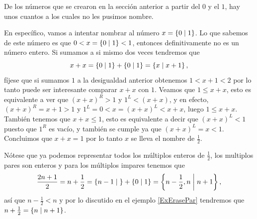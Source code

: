     \begin{example}
        De los n\'umeros que se crearon en la secci\'on anterior a partir del $0$ y el $1$, hay unos cuantos a los cuales no les pusimos nombre.

        En espec\'ifico, vamos a intentar nombrar al n\'umero $x = \left\{0\;\middle|\; 1\right\}$. Lo que sabemos de este n\'umero es que $0 < x = \left\{0\;\middle|\; 1\right\} < 1$, entonces definitivamente no es un n\'umero entero. Si sumamos a si mismo dos veces tendremos que
        \[
            x + x = \left\{0\;\middle|\; 1\right\} + \left\{0\;\middle|\; 1\right\} = \left\{x\;\middle|\; x+1\right\},
        \]
        f\'ijese que si sumamos $1$ a la desigualdad anterior obtenemos $1 < x+1 < 2$ por lo tanto puede ser interesante comparar $x+x$ con $1$. Veamos que $1 \le x+x$, esto es equivalente a ver que $(x+x)^R > 1$ y $1^L < (x+x)$, y en efecto, $(x+x)^R = x+1 > 1$ y $1^L = 0 < x = (x+x)^L < x+x$, luego $1 \le x+x$. Tambi\'en tenemos que $x+x \le 1$, esto es equivalente a decir que $(x+x)^L < 1$ puesto que $1^R$ es vac\'io, y tambi\'en se cumple ya que $(x+x)^L = x < 1$. Concluimos que $x+x = 1$ por lo tanto $x$ se lleva el nombre de $\frac{1}{2}$.

        N\'otese que ya podemos representar todos los m\'ultiplos enteros de $\frac{1}{2}$, los multiplos pares son enteros y para los m\'ultiplos impares tenemos que 
        \[
            \frac{2n+1}{2} = n+\frac{1}{2} = \left\{n-1\;\middle|\; \right\} + \left\{0\;\middle|\; 1\right\} = \left\{n-\frac{1}{2}, n\;\middle|\; n+1\right\},
        \]
        as\'i que $n-\frac{1}{2} < n$ y por lo discutido en el ejemplo \ref{ExErasePar} tendremos que $n+\frac{1}{2} = \left\{n\;\middle|\; n+1\right\}$.
    \end{example}

